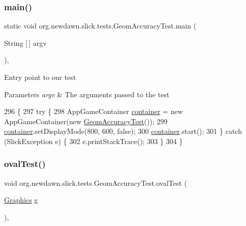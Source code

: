\subsubsection{\texorpdfstring{main()}{main()}}
{\footnotesize\ttfamily static void org.\+newdawn.\+slick.\+tests.\+Geom\+Accuracy\+Test.\+main (\begin{DoxyParamCaption}\item[{String \mbox{[}$\,$\mbox{]}}]{argv }\end{DoxyParamCaption})\hspace{0.3cm}{\ttfamily [inline]}, {\ttfamily [static]}}

Entry point to our test


\begin{DoxyParams}{Parameters}
{\em argv} & The arguments passed to the test \\
\hline
\end{DoxyParams}

\begin{DoxyCode}
296                                            \{
297         \textcolor{keywordflow}{try} \{
298             AppGameContainer \mbox{\hyperlink{classorg_1_1newdawn_1_1slick_1_1tests_1_1_geom_accuracy_test_aa36ef5e207393c1e48bdc579da524cf0}{container}} = \textcolor{keyword}{new} AppGameContainer(\textcolor{keyword}{new} 
      \mbox{\hyperlink{classorg_1_1newdawn_1_1slick_1_1tests_1_1_geom_accuracy_test_a7514bf015609473a1d57b310a07f3a01}{GeomAccuracyTest}}());
299             \mbox{\hyperlink{classorg_1_1newdawn_1_1slick_1_1tests_1_1_geom_accuracy_test_aa36ef5e207393c1e48bdc579da524cf0}{container}}.setDisplayMode(800, 600, \textcolor{keyword}{false});
300             \mbox{\hyperlink{classorg_1_1newdawn_1_1slick_1_1tests_1_1_geom_accuracy_test_aa36ef5e207393c1e48bdc579da524cf0}{container}}.start();
301         \} \textcolor{keywordflow}{catch} (SlickException e) \{
302             e.printStackTrace();
303         \}
304     \}
\end{DoxyCode}
\mbox{\label{classorg_1_1newdawn_1_1slick_1_1tests_1_1_geom_accuracy_test_abd5a4ec899e7ccd77fc50de593b42fbf}} 
\subsubsection{\texorpdfstring{oval\+Test()}{ovalTest()}}
{\footnotesize\ttfamily void org.\+newdawn.\+slick.\+tests.\+Geom\+Accuracy\+Test.\+oval\+Test (\begin{DoxyParamCaption}\item[{\mbox{\hyperlink{classorg_1_1newdawn_1_1slick_1_1_graphics}{Graphics}}}]{g }\end{DoxyParamCaption})\hspace{0.3cm}{\ttfamily [inline]}, {\ttfamily [package]}}

